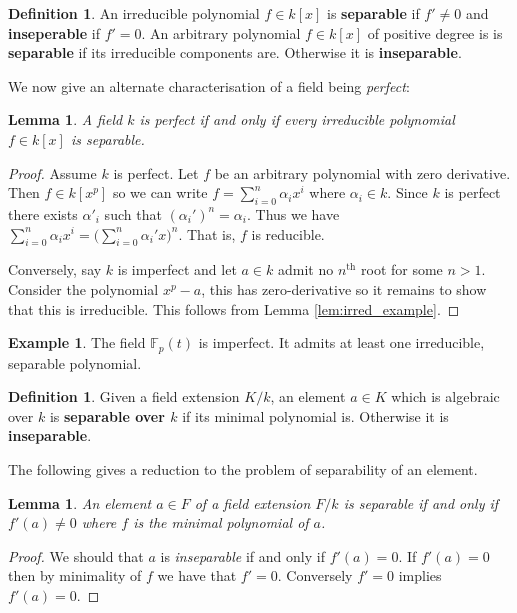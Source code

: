 \documentclass[12pt]{article}
\theoremstyle{plain}
\newtheorem{lemma}[thm]{Lemma}
\theoremstyle{definition}
\newtheorem{defn}[thm]{Definition} %
\newtheorem{example}[thm]{Example}
\newcommand{\bb}[1]{\mathbb{#1}}
\begin{document}
	\begin{defn}\label{def:separable_irred_poly}
		An irreducible polynomial $f \in k[x]$ is \textbf{separable} if $f' \neq 0$ and \textbf{inseperable} if $f' = 0$. An arbitrary polynomial $f \in k[x]$ of positive degree is is \textbf{separable} if its irreducible components are. Otherwise it is \textbf{inseparable}. 
	\end{defn}
	We now give an alternate characterisation of a field being \emph{perfect}:
	\begin{lemma}
		\label{lem:perf_alt_defn}
		A field $k$ is perfect if and only if every irreducible polynomial $f \in k[x]$ is separable.
	\end{lemma}
	\begin{proof}
		Assume $k$ is perfect. Let $f$ be an arbitrary polynomial with zero derivative. Then $f \in k[x^p]$ so we can write $f = \sum_{i = 0}^n \alpha_i x^i$ where $\alpha_i \in k$. Since $k$ is perfect there exists $\alpha'_i$ such that $(\alpha_i')^n = \alpha_i$. Thus we have $\sum_{i = 0}^n \alpha_i x^i = \big(\sum_{i = 0}^n \alpha_i' x\big)^n$. That is, $f$ is reducible.
		
		Conversely, say $k$ is imperfect and let $a \in k$ admit no $n^\text{th}$ root for some $n > 1$. Consider the polynomial $x^p - a$, this has zero-derivative so it remains to show that this is irreducible. This follows from Lemma \ref{lem:irred_example}.
	\end{proof}
	\begin{example}
		\label{ex:imperfect} The field $\bb{F}_p(t)$ is imperfect. It admits at least one irreducible, separable polynomial.
	\end{example}
	\begin{defn}\label{def:separable_element}
		Given a field extension $K/k$, an element $a \in K$ which is algebraic over $k$ is \textbf{separable over $k$} if its minimal polynomial is. Otherwise it is \textbf{inseparable}.
	\end{defn}
	The following gives a reduction to the problem of separability of an element.
	\begin{lemma}
		\label{lem:sep_elt_alt_def}
		An element $a \in F$ of a field extension $F/k$ is separable if and only if $f'(a) \neq 0$ where $f$ is the minimal polynomial of $a$.
	\end{lemma}
	\begin{proof}
		We should that $a$ is \emph{inseparable} if and only if $f'(a) = 0$. If $f'(a) = 0$ then by minimality of $f$ we have that $f' = 0$. Conversely $f' = 0$ implies $f'(a) = 0$.
	\end{proof}
\end{document}

